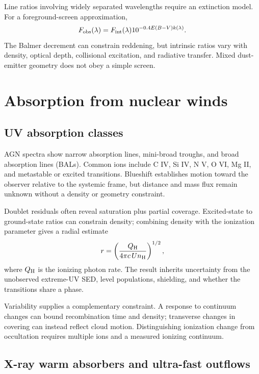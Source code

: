 Line ratios involving widely separated wavelengths require an extinction
model. For a foreground-screen approximation,
\begin{equation}
 F_{\rm obs}(\lambda)=F_{\rm int}(\lambda)
 10^{-0.4E(B-V)k(\lambda)}.
 \label{eq:reddening}
\end{equation}
The Balmer decrement can constrain reddening, but intrinsic ratios vary with
density, optical depth, collisional excitation, and radiative transfer.
Mixed dust-emitter geometry does not obey a simple screen.

\section{Absorption from nuclear winds}

\subsection{UV absorption classes}

AGN spectra show narrow absorption lines, mini-broad troughs, and broad
absorption lines (BALs). Common ions include C IV, Si IV, N V, O VI, Mg II,
and metastable or excited transitions. Blueshift establishes motion toward
the observer relative to the systemic frame, but distance and mass flux remain
unknown without a density or geometry constraint.

Doublet residuals often reveal saturation plus partial coverage. Excited-state
to ground-state ratios can constrain density; combining density with the
ionization parameter gives a radial estimate
\begin{equation}
 r=\left(\frac{Q_{\rm H}}{4\pi c\,U n_{\rm H}}\right)^{1/2},
 \label{eq:agn-wind-radius}
\end{equation}
where $Q_{\rm H}$ is the ionizing photon rate. The result inherits uncertainty
from the unobserved extreme-UV SED, level populations, shielding, and whether
the transitions share a phase.

Variability supplies a complementary constraint. A response to continuum
changes can bound recombination time and density; transverse changes in
covering can instead reflect cloud motion. Distinguishing ionization change
from occultation requires multiple ions and a measured ionizing continuum.

\subsection{X-ray warm absorbers and ultra-fast outflows}


